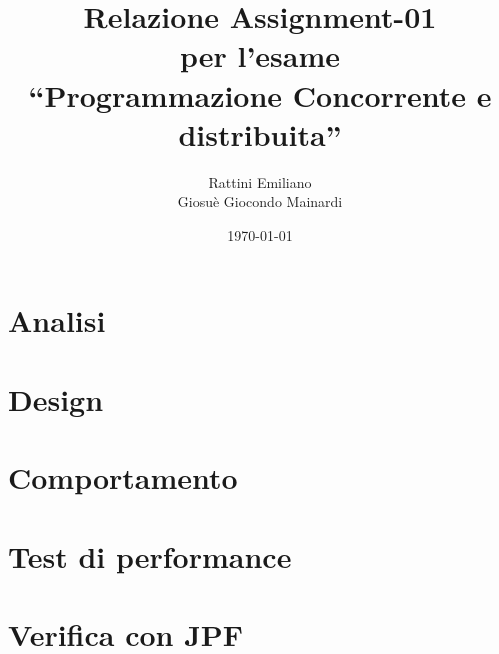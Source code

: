 \documentclass[a4paper,12pt]{report}
\title{Relazione Assignment-01 \\ per l'esame \\ ``Programmazione Concorrente e distribuita''}
\author{Rattini Emiliano\\Giosuè Giocondo Mainardi}
\date{\today}
\begin{document}
\maketitle

\tableofcontents

\chapter{Analisi}

\chapter{Design}

\chapter{Comportamento}

\chapter{Test di performance}

\chapter{Verifica con JPF}
\end{document}
